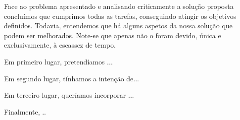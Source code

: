 \documentclass[a4paper]{report}
\begin{document}
Face ao problema apresentado e analisando criticamente a solução proposta concluímos que cumprimos
todas as tarefas, conseguindo atingir os objetivos definidos. Todavia, entendemos que há alguns
aspetos da nossa solução que podem ser melhorados. Note-se que apenas não o foram devido, única
e exclusivamente, à escassez de tempo.

Em primeiro lugar, pretendíamos ...

Em segundo lugar, tínhamos a intenção de...

Em terceiro lugar, queríamos incorporar ...

Finalmente, ..
\end{document}
